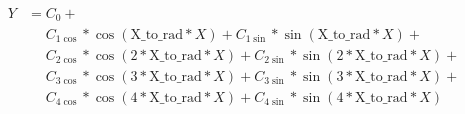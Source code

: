 \begin{equation*}\begin{split}
Y &= C_0 + \\
  &\phantom{=} C_{1\cos} * \cos (\text{X\_to\_rad} * X) + C_{1\sin} * \sin (\text{X\_to\_rad} * X) + \\
  &\phantom{=} C_{2\cos} * \cos (2 * \text{X\_to\_rad} * X) + C_{2\sin} * \sin (2 * \text{X\_to\_rad} *X) + \\
  &\phantom{=} C_{3\cos} * \cos (3 * \text{X\_to\_rad} * X) + C_{3\sin} * \sin (3 * \text{X\_to\_rad} *X) + \\
  &\phantom{=} C_{4\cos} * \cos (4 * \text{X\_to\_rad} * X) + C_{4\sin} * \sin (4 * \text{X\_to\_rad} *X)
\end{split}\end{equation*}


